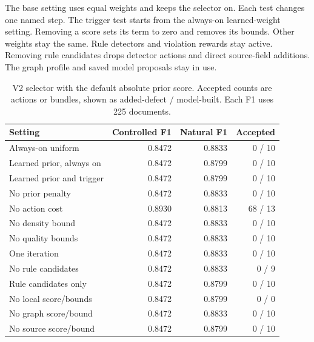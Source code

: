 The base setting uses equal weights and keeps the selector on.
Each test changes one named step. The trigger test starts from the
always-on learned-weight setting. Removing a score sets its term to zero
and removes its bounds. Other weights stay the same.
Rule detectors and violation rewards stay active.
Removing rule candidates drops detector actions and direct source-field
additions. The graph profile and saved model proposals stay in use.

\begin{table}[t]

\centering

\caption{V2 selector with the default absolute prior score. Accepted counts are actions or bundles, shown as added-defect / model-built. Each F1 uses 225 documents.}
\label{tab:optimizer_complete}

\small

\begin{tabular}{lrrr}

\toprule

Setting & Controlled F1 & Natural F1 & Accepted \\

\midrule

Always-on uniform & 0.8472 & 0.8833 & 0 / 10 \\

Learned prior, always on & 0.8472 & 0.8799 & 0 / 10 \\

Learned prior and trigger & 0.8472 & 0.8799 & 0 / 10 \\

No prior penalty & 0.8472 & 0.8833 & 0 / 10 \\

No action cost & 0.8930 & 0.8813 & 68 / 13 \\

No density bound & 0.8472 & 0.8833 & 0 / 10 \\

No quality bounds & 0.8472 & 0.8833 & 0 / 10 \\

One iteration & 0.8472 & 0.8833 & 0 / 10 \\

No rule candidates & 0.8472 & 0.8833 & 0 / 9 \\

Rule candidates only & 0.8472 & 0.8799 & 0 / 10 \\

No local score/bounds & 0.8472 & 0.8799 & 0 / 0 \\

No graph score/bound & 0.8472 & 0.8833 & 0 / 10 \\

No source score/bound & 0.8472 & 0.8799 & 0 / 10 \\

\bottomrule

\end{tabular}

\end{table}

